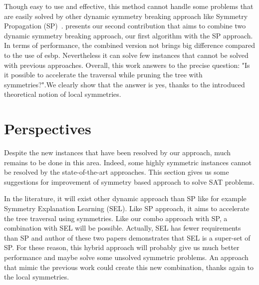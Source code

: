 Though easy to use and effective, this method cannot handle some problems that are easily solved by other
dynamic symmetry breaking approach like Symmetry Propagation (SP)~\cite{Devriendt12}.
 presents our second contribution that aims to combine two dynamic symmetry breaking approach, our first algorithm  with the SP approach. In terms of performance, the combined version not brings big difference
compared to the use of esbp. Nevertheless it can solve few instances that cannot be solved with previous approaches.
Overall,  this  work  answers  to  the  precise  question: "Is it possible to accelerate the traversal while pruning the tree with symmetries?".We clearly show that the answer is yes, thanks to the introduced theoretical notion of local symmetries.


%
%
%
%
%
%
%
%
%

\section{Perspectives}

Despite the new instances that have been resolved by our approach, much remains to be done in this area.
Indeed, some highly symmetric instances cannot be resolved by the state-of-the-art approaches.
This section gives us some suggestions for improvement of symmetry based approach to solve SAT problems.

In the literature, it will exist other dynamic approach than SP like for example Symmetry Explanation Learning (SEL)\cite{devriendt2017symmetric}. Like SP approach, it aims to accelerate the tree traversal using symmetries.
Like our combo approach with SP, a combination with SEL will be possible.
Actually, SEL has fewer requirements than SP and author of these two papers demonstrates that
SEL is a super-set of SP. For these reason, this hybrid approach will probably give us much better performance and 
maybe solve some unsolved symmetric problems.
An approach that mimic the previous work could create this new combination, thanks again to the local symmetries.

